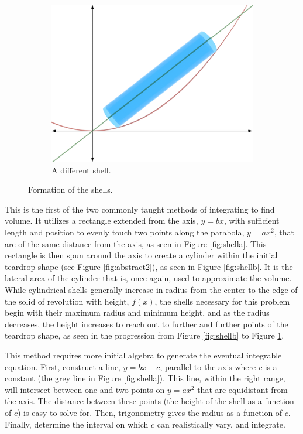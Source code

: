 \documentclass{article}
\begin{document}
\begin{figure}[h!]
\begin{subfigure}[b]{0.32\linewidth}
    \includegraphics[width=\linewidth]{Blender/ParabolaLineIntegration-ShellCylinder2-f2_0001.png}
    \caption{A different shell.}
    \label{fig:shellc}
  \end{subfigure}
  \caption{Formation of the shells.}
  \label{fig:shell1}
\end{figure}

This is the first of the two commonly taught methods of integrating to find volume. It utilizes a rectangle extended from the axis, $y=bx$, with sufficient length and position to evenly touch two points along the parabola, $y=ax^2$, that are of the same distance from the axis, as seen in Figure \ref{fig:shella}. This rectangle is then spun around the axis to create a cylinder within the initial teardrop shape (see Figure \ref{fig:abstract2}), as seen in Figure \ref{fig:shellb}. It is the lateral area of the cylinder that is, once again, used to approximate the volume. While cylindrical shells generally increase in radius from the center to the edge of the solid of revolution with height, $f(x)$, the shells necessary for this problem begin with their maximum radius and minimum height, and as the radius decreases, the height increases to reach out to further and further points of the teardrop shape, as seen in the progression from Figure \ref{fig:shellb} to Figure \ref{fig:shellc}.\par
This method requires more initial algebra to generate the eventual integrable equation. First, construct a line, $y=bx+c$, parallel to the axis where $c$ is a constant (the grey line in Figure \ref{fig:shella}). This line, within the right range, will intersect between one and two points on $y=ax^2$ that are equidistant from the axis. The distance between these points (the height of the shell as a function of $c$) is easy to solve for. Then, trigonometry gives the radius as a function of $c$. Finally, determine the interval on which $c$ can realistically vary, and integrate.
\end{document}

